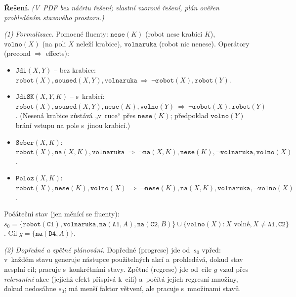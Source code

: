 \medskip
\noindent\textbf{Řešení.} \textit{(V~PDF bez náčrtu řešení; vlastní vzorové řešení, plán ověřen prohledáním stavového prostoru.)}\par

\noindent\emph{(1) Formalizace.} Pomocné fluenty: $\mathtt{nese}(K)$ (robot nese krabici $K$), $\mathtt{volno}(X)$ (na poli $X$ neleží krabice), $\mathtt{volnaruka}$ (robot nic nenese). Operátory (precond $\Rightarrow$ effects):
\begin{itemize}[nosep]
  \item $\mathtt{Jdi}(X,Y)$ -- bez krabice: $\mathtt{robot}(X),\allowbreak\mathtt{soused}(X,Y),\allowbreak\mathtt{volnaruka}\ \Rightarrow\ \allowbreak \neg\mathtt{robot}(X),\allowbreak\mathtt{robot}(Y)$.
  \item $\mathtt{JdiSK}(X,Y,K)$ -- s~krabicí: $\mathtt{robot}(X),\allowbreak\mathtt{soused}(X,Y),\allowbreak\mathtt{nese}(K),\allowbreak\mathtt{volno}(Y)\ \Rightarrow\ \allowbreak \neg\mathtt{robot}(X),\allowbreak\mathtt{robot}(Y)$. (Nesená krabice zůstává „v~ruce`` přes $\mathtt{nese}(K)$; předpoklad $\mathtt{volno}(Y)$ brání vstupu na pole s~jinou krabicí.)
  \item $\mathtt{Seber}(X,K)$: $\mathtt{robot}(X),\allowbreak\mathtt{na}(X,K),\allowbreak\mathtt{volnaruka}\ \Rightarrow\ \allowbreak \neg\mathtt{na}(X,K),\allowbreak\mathtt{nese}(K),\neg\mathtt{volnaruka},\mathtt{volno}(X)$.
  \item $\mathtt{Poloz}(X,K)$: $\mathtt{robot}(X),\allowbreak\mathtt{nese}(K),\allowbreak\mathtt{volno}(X)\ \Rightarrow\ \allowbreak \neg\mathtt{nese}(K),\allowbreak\mathtt{na}(X,K),\allowbreak\mathtt{volnaruka},\neg\mathtt{volno}(X)$.
\end{itemize}
Počáteční stav (jen měnící se fluenty): $s_0=\{\mathtt{robot}(\mathtt{C1}),\mathtt{volnaruka},\mathtt{na}(\mathtt{A1},A),\mathtt{na}(\mathtt{C2},B)\}\cup\{\mathtt{volno}(X):X\text{ volné},X\neq\mathtt{A1},\mathtt{C2}\}$. Cíl $g=\{\mathtt{na}(\mathtt{D4},A)\}$.

\noindent\emph{(2) Dopředné a zpětné plánování.} Dopředné (progrese) jde od~$s_0$ vpřed: v~každém stavu generuje nástupce použitelných akcí a~prohledává, dokud stav nesplní cíl; pracuje s~konkrétními stavy. Zpětné (regrese) jde od~cíle $g$ vzad přes \emph{relevantní} akce (jejichž efekt přispívá k~cíli) a~počítá jejich regresní množiny, dokud nedosáhne $s_0$; má menší faktor větvení, ale pracuje s~množinami stavů.

